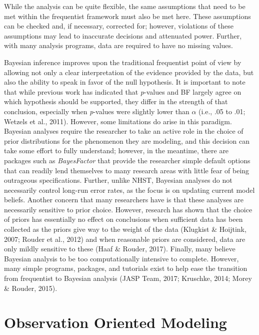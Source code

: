 \documentclass[,man, mask]{apa6}
\theoremstyle{definition}
\theoremstyle{definition}
\theoremstyle{definition}
\theoremstyle{remark}
\begin{document}
While the analysis can be quite flexible, the same assumptions that need
to be met within the frequentist framework must also be met here. These
assumptions can be checked and, if necessary, corrected for; however,
violations of these assumptions may lead to inaccurate decisions and
attenuated power. Further, with many analysis programs, data are
required to have no missing values.

Bayesian inference improves upon the traditional frequentist point of
view by allowing not only a clear interpretation of the evidence
provided by the data, but also the ability to speak in favor of the null
hypothesis. It is important to note that while previous work has
indicated that \emph{p}-values and BF largely agree on which hypothesis
should be supported, they differ in the strength of that conclusion,
especially when \emph{p}-values were slightly lower than \(\alpha\)
(i.e., .05 to .01; Wetzels et al., 2011). However, some limitations do
arise in this paradigm. Bayesian analyses require the researcher to take
an active role in the choice of prior distributions for the phenomenon
they are modeling, and this decision can take some effort to fully
understand; however, in the meantime, there are packages such as
\emph{BayesFactor} that provide the researcher simple default options
that can readily lend themselves to many research areas with little fear
of being outrageous specifications. Further, unlike NHST, Bayesian
analyses do not necessarily control long-run error rates, as the focus
is on updating current model beliefs. Another concern that many
researchers have is that these analyses are necessarily sensitive to
prior choice. However, research has shown that the choice of priors has
essentially no effect on conclusions when sufficient data has been
collected as the priors give way to the weight of the data (Klugkist \&
Hoijtink, 2007; Rouder et al., 2012) and when reasonable priors are
considered, data are only mildly sensitive to these (Haaf \& Rouder,
2017). Finally, many believe Bayesian analysis to be too computationally
intensive to complete. However, many simple programs, packages, and
tutorials exist to help ease the transition from frequentist to Bayesian
analysis (JASP Team, 2017; Kruschke, 2014; Morey \& Rouder, 2015).

\section{Observation Oriented
Modeling}\label{observation-oriented-modeling}
\end{document}
